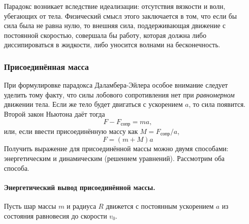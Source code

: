 \vspace{0.5em}
Парадокс возникает вследствие идеализации: отсутствия вязкости и волн, убегающих от тела. Физический смысл этого заключается в том, что если бы сила была не равна нулю, то внешняя сила, поддерживающая
движение с постоянной скоростью, совершала бы работу, которая должна либо
диссипироваться в жидкости, либо уносится волнами на бесконечность.


\subsubsection{Присоединённая масса}

При формулировке парадокса Даламбера-Эйлера особое внимание следует уделить тому факту, что силы лобового сопротивления нет при \textit{равномерном} движении тела. Если же тело будет двигаться с ускорением $a$, то сила появится. Второй закон Ньютона даёт тогда
\begin{equation}
	F-F_\text{сопр} = ma,
\end{equation}
или, если ввести присоединённую массу как $M = F_\text{сопр}/a$,
\begin{equation}
	F = (m+M)a
\end{equation}
Получить выражение для присоединённой массы можно двумя способами: энергетическим и динамическим (решением уравнений). Рассмотрим оба способа.

\paragraph{Энергетический вывод присоединённой массы. } Пусть шар массы 
$m$ и радиуса $R$ движется с постоянным ускорением $a$ из состояния 
равновесия до скорости $v_0$.

